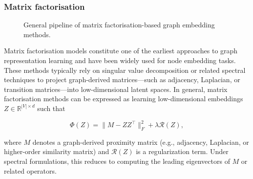 \subsubsection{ Matrix factorisation}

\begin{figure}[H]
\centering
{}
\caption{General pipeline of matrix factorisation-based graph embedding methods.}
\label{fig:mf_pipeline}
\end{figure}

Matrix factorisation models constitute one of the earliest approaches to graph representation learning and have been widely used for node embedding tasks. These methods typically rely on singular value decomposition or related spectral techniques to project graph-derived matrices—such as adjacency, Laplacian, or transition matrices—into low-dimensional latent spaces.
In general, matrix factorisation methods can be expressed as learning
low-dimensional embeddings $Z \in \mathbb{R}^{|V|\times d}$ such that

\[
\Phi(Z) = \| M - ZZ^\top \|_F^2 + \lambda \mathcal{R}(Z),
\]

where $M$ denotes a graph-derived proximity matrix (e.g., adjacency,
Laplacian, or higher-order similarity matrix) and $\mathcal{R}(Z)$
is a regularization term. Under spectral formulations, this reduces
to computing the leading eigenvectors of $M$ or related operators.

